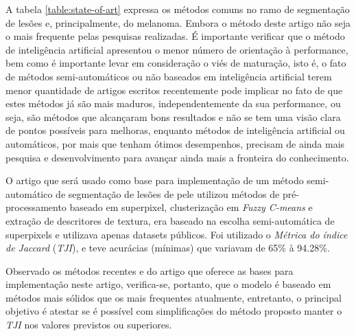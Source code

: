 A tabela \ref{table:state-of-art} expressa os métodos comuns no ramo de segmentação de lesões e, principalmente, do melanoma. Embora o método deste artigo não seja o mais frequente pelas pesquisas realizadas. É importante verificar que o método de inteligência artificial apresentou o menor número de orientação à performance, bem como é importante levar em consideração o viés de maturação, isto é, o fato de métodos semi-automáticos ou não baseados em inteligência artificial terem menor quantidade de artigos escritos recentemente pode implicar no fato de que estes métodos já são mais maduros, independentemente da sua performance, ou seja, são métodos que alcançaram bons resultados e não se tem uma visão clara de pontos possíveis para melhoras, enquanto métodos de inteligência artificial ou automáticos, por mais que tenham ótimos desempenhos, precisam de ainda mais pesquisa e desenvolvimento para avançar ainda mais a fronteira do conhecimento.

O artigo \cite{santos2020skin} que será usado como base para implementação de um método semi-automático de segmentação de lesões de pele utilizou métodos de pré-processamento baseado em superpixel, clusterização em \emph{Fuzzy C-means} e extração de descritores de textura, era baseado na escolha semi-automática de superpixels e utilizava apenas datasets públicos. Foi utilizado o \emph{Métrica do índice de Jaccard} (\emph{TJI}), e teve acurácias (mínimas) que variavam de 65\% à 94.28\%.

Observado os métodos recentes e do artigo que oferece as bases para implementação neste artigo, verifica-se, portanto, que o modelo é baseado em métodos mais sólidos que os mais frequentes atualmente, entretanto, o principal objetivo é atestar se é possível com simplificações do método proposto \cite{santos2020skin} manter o \emph{TJI} nos valores previstos ou superiores.

